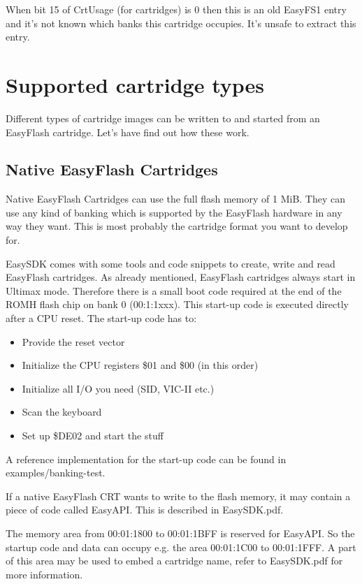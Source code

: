 \documentclass[a4paper,oneside]{memoir}
\begin{document}
When bit 15 of CrtUsage (for cartridges) is 0 then this is an old EasyFS1
entry and it's not known which banks this cartridge occupies.
It's unsafe to extract this entry.


\chapter{Supported cartridge types}

Different types of cartridge images can be written to and started from an
EasyFlash cartridge. Let's have find out how these work.

\section{Native EasyFlash Cartridges}\label{native-easyflash-cartridges}

Native EasyFlash Cartridges can use the full flash memory of 1 MiB. They can
use any kind of banking which is supported by the EasyFlash hardware in any way
they want. This is most probably the cartridge format you want to develop for.

EasySDK comes with some tools and code snippets to create, write and read
EasyFlash cartridges.
As already mentioned, EasyFlash cartridges always start in Ultimax mode.
Therefore there is a small boot code required at the end of the ROMH flash chip
on bank 0 (00:1:1xxx). This start-up code is executed directly after a CPU
reset.
The start-up code has to:

\begin{itemize}
  \item Provide the reset vector
  \item Initialize the CPU registers \$01 and \$00 (in this order)
  \item Initialize all I/O you need (SID, VIC-II etc.)
  \item Scan the keyboard
  \item Set up \$DE02 and start the stuff
\end{itemize}

A reference implementation for the start-up code can be found in
examples/banking-test.

If a native EasyFlash CRT wants to write to the flash memory, it may contain a
piece of code called EasyAPI. This is described in EasySDK.pdf.

The memory area from 00:01:1800 to 00:01:1BFF is reserved for EasyAPI. So the
startup code and data can occupy e.g. the area 00:01:1C00 to 00:01:1FFF. A part
of this area may be used to embed a cartridge name, refer to EasySDK.pdf for more information.
\end{document}

